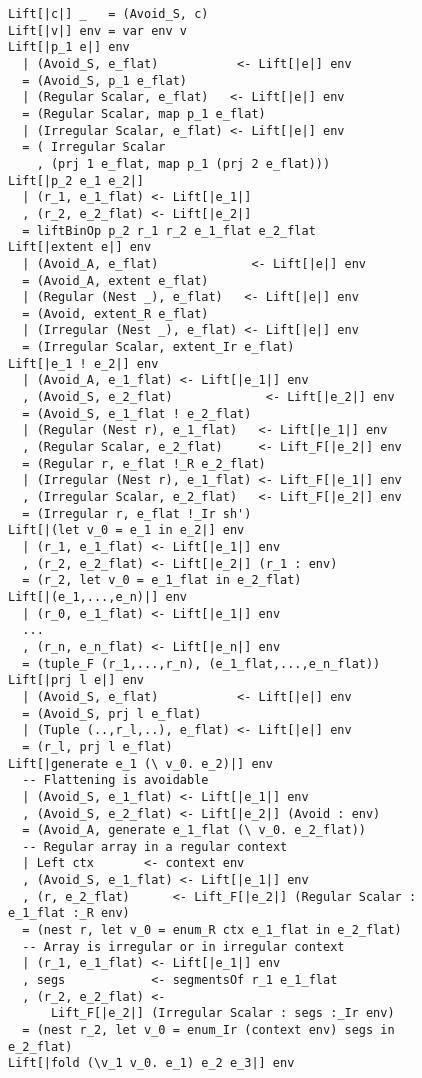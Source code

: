 \begin{figure}
\begin{lstlisting}[multicols=2,style=ndp]
Lift[|c|] _   = (Avoid_S, c)
Lift[|v|] env = var env v
Lift[|p_1 e|] env
  | (Avoid_S, e_flat)           <- Lift[|e|] env
  = (Avoid_S, p_1 e_flat)
  | (Regular Scalar, e_flat)   <- Lift[|e|] env
  = (Regular Scalar, map p_1 e_flat)
  | (Irregular Scalar, e_flat) <- Lift[|e|] env
  = ( Irregular Scalar
    , (prj 1 e_flat, map p_1 (prj 2 e_flat)))
Lift[|p_2 e_1 e_2|]
  | (r_1, e_1_flat) <- Lift[|e_1|]
  , (r_2, e_2_flat) <- Lift[|e_2|]
  = liftBinOp p_2 r_1 r_2 e_1_flat e_2_flat
Lift[|extent e|] env
  | (Avoid_A, e_flat)             <- Lift[|e|] env
  = (Avoid_A, extent e_flat)
  | (Regular (Nest _), e_flat)   <- Lift[|e|] env
  = (Avoid, extent_R e_flat)
  | (Irregular (Nest _), e_flat) <- Lift[|e|] env
  = (Irregular Scalar, extent_Ir e_flat)
Lift[|e_1 ! e_2|] env
  | (Avoid_A, e_1_flat) <- Lift[|e_1|] env
  , (Avoid_S, e_2_flat)             <- Lift[|e_2|] env
  = (Avoid_S, e_1_flat ! e_2_flat)
  | (Regular (Nest r), e_1_flat)   <- Lift[|e_1|] env
  , (Regular Scalar, e_2_flat)     <- Lift_F[|e_2|] env
  = (Regular r, e_flat !_R e_2_flat)
  | (Irregular (Nest r), e_1_flat) <- Lift_F[|e_1|] env
  , (Irregular Scalar, e_2_flat)   <- Lift_F[|e_2|] env
  = (Irregular r, e_flat !_Ir sh')
Lift[|(let v_0 = e_1 in e_2|] env
  | (r_1, e_1_flat) <- Lift[|e_1|] env
  , (r_2, e_2_flat) <- Lift[|e_2|] (r_1 : env)
  = (r_2, let v_0 = e_1_flat in e_2_flat)
Lift[|(e_1,...,e_n)|] env
  | (r_0, e_1_flat) <- Lift[|e_1|] env
  ...
  , (r_n, e_n_flat) <- Lift[|e_n|] env
  = (tuple_F (r_1,...,r_n), (e_1_flat,...,e_n_flat))
Lift[|prj l e|] env
  | (Avoid_S, e_flat)           <- Lift[|e|] env
  = (Avoid_S, prj l e_flat)
  | (Tuple (..,r_l,..), e_flat) <- Lift[|e|] env
  = (r_l, prj l e_flat)
Lift[|generate e_1 (\ v_0. e_2)|] env
  -- Flattening is avoidable
  | (Avoid_S, e_1_flat) <- Lift[|e_1|] env
  , (Avoid_S, e_2_flat) <- Lift[|e_2|] (Avoid : env)
  = (Avoid_A, generate e_1_flat (\ v_0. e_2_flat))
  -- Regular array in a regular context
  | Left ctx       <- context env
  , (Avoid_S, e_1_flat) <- Lift[|e_1|] env
  , (r, e_2_flat)      <- Lift_F[|e_2|] (Regular Scalar : e_1_flat :_R env)
  = (nest r, let v_0 = enum_R ctx e_1_flat in e_2_flat)
  -- Array is irregular or in irregular context
  | (r_1, e_1_flat) <- Lift[|e_1|] env
  , segs            <- segmentsOf r_1 e_1_flat
  , (r_2, e_2_flat) <-
      Lift_F[|e_2|] (Irregular Scalar : segs :_Ir env)
  = (nest r_2, let v_0 = enum_Ir (context env) segs in e_2_flat)
Lift[|fold (\v_1 v_0. e_1) e_2 e_3|] env

\end{lstlisting}
\end{figure}
